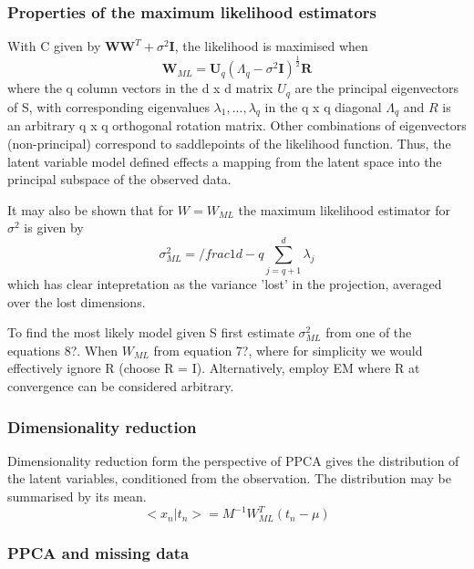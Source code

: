 \documentclass[ %
                    author={Dillon Keith Diep},
                supervisor={Dr. Carl Henrik Ek},
                    degree={MEng},
                     title={Assisted Content Generation for 3D Hair Geometry},
                  subtitle={[INCOMPLETE DRAFT, CONTAINS NOTES FROM RESEARCH]},
                      type={Research},
                      year={2014} ]{dissertation}
\begin{document}
\subsubsection{Properties of the maximum likelihood estimators}
With C given by  $\mathbf{WW}^T+\sigma^2\mathbf{I}$, the likelihood is maximised when
\begin{equation}
	\mathbf{W}_{ML}=\mathbf{U}_q(\Lambda	_q-\sigma^2\mathbf{I})^\frac{1}{2}\mathbf{R}
\end{equation}
where the q column vectors in the d x d matrix $U_q$ are the principal eigenvectors of S, with corresponding eigenvalues $\lambda_1,...,\lambda_q$ in the q x q diagonal $\Lambda_q$ and $R$ is an arbitrary q x q orthogonal rotation matrix. Other combinations of eigenvectors (non-principal) correspond to saddlepoints of the likelihood function. Thus, the latent variable model defined effects a mapping from the latent space into the principal subspace of the observed data.

It may also be shown that for $W=W_{ML}$ the maximum likelihood estimator for $\sigma^2$ is given by
\begin{equation}
	\sigma^2_{ML}=/frac{1}{d-q}\sum^d_{j=q+1}\lambda_j
\end{equation}
which has clear intepretation as the variance 'lost' in the projection, averaged over the lost dimensions.

To find the most likely model given S first estimate $\sigma^2_{ML}$ from one of the equations 8?. When $W_{ML}$ from equation 7?, where for simplicity we would effectively ignore R (choose R = I). Alternatively, employ EM where R at convergence can be considered arbitrary.

\subsubsection{Dimensionality reduction}
Dimensionality reduction form the perspective of PPCA gives the distribution of the latent variables, conditioned from the observation. The distribution may be summarised by its mean.
\begin{equation}
	<x_n|t_n>=M^{-1}W^T_{ML}(t_n-\mu)
\end{equation}

\subsubsection{PPCA and missing data}
\end{document}
